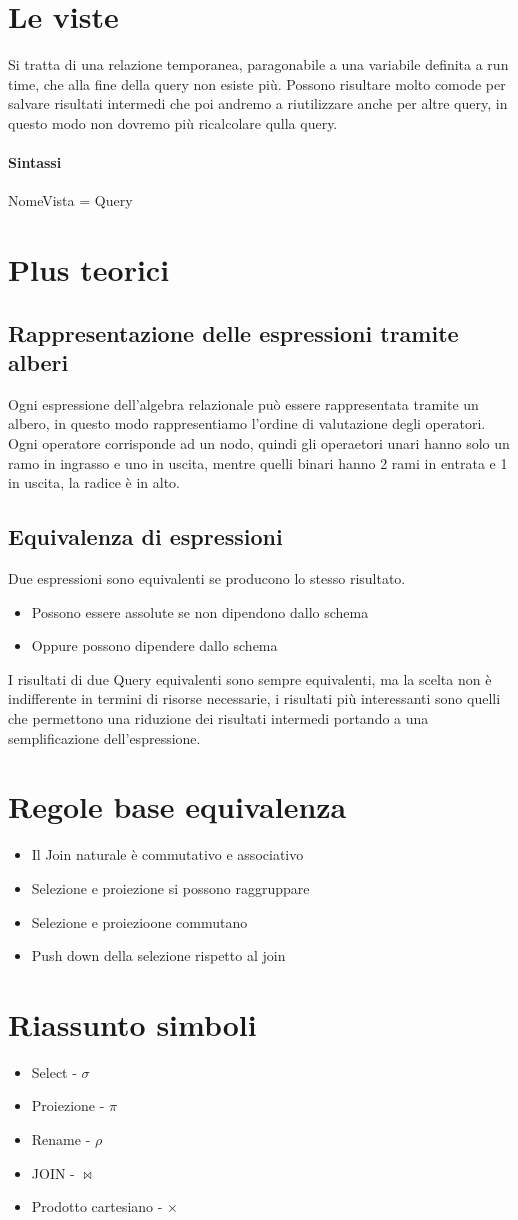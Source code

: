\section{Le viste}
Si tratta di una relazione temporanea, paragonabile a una variabile definita a run time, che alla fine della
query non esiste più. Possono risultare molto comode per salvare risultati intermedi che poi andremo
a riutilizzare anche per altre query, in questo modo non dovremo più ricalcolare qulla query.
\paragraph*{Sintassi} NomeVista = Query
\section{Plus teorici}
\subsection{Rappresentazione delle espressioni tramite alberi}
Ogni espressione dell'algebra relazionale può essere rappresentata tramite un albero, in questo modo
rappresentiamo l'ordine di valutazione degli operatori. Ogni operatore corrisponde
ad un nodo, quindi gli operaetori unari hanno solo un ramo in ingrasso e uno in uscita, mentre
quelli binari hanno 2 rami in entrata e 1 in uscita, la radice è in alto.\\
\subsection{Equivalenza di espressioni}
Due espressioni sono equivalenti se producono lo stesso risultato.
\begin{itemize}
    \item Possono essere assolute se non dipendono dallo schema
    \item Oppure possono dipendere dallo schema
\end{itemize}
I risultati di due Query equivalenti sono sempre equivalenti, ma la scelta non è 
indifferente in termini di risorse necessarie, i risultati più interessanti sono quelli che
permettono una riduzione dei risultati intermedi portando a una semplificazione dell'espressione.
\section{Regole base equivalenza}
\begin{itemize}
    \item Il Join naturale è commutativo e associativo
    \item Selezione e proiezione si possono raggruppare
    \item Selezione e proiezioone commutano
    \item Push down della selezione rispetto al join
\end{itemize}
\section{Riassunto simboli}
\begin{itemize}
    \item Select - $\sigma$
    \item Proiezione - $\pi$ 
    \item Rename - $\rho$
    \item JOIN - $\bowtie$
    \item Prodotto cartesiano - $\times$
\end{itemize}